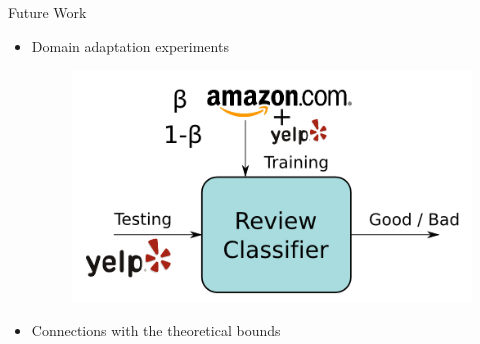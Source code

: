 \documentclass{beamer}
\begin{document}
\begin{frame}{Future Work}
\begin{itemize}
\item Domain adaptation experiments
\begin{figure}[ht]
\centering
\includegraphics[scale=.3]{adaptation}
\label{fig:adaptation}
\end{figure}
\item Connections with the theoretical bounds
\end{itemize}

\end{frame}
\end{document}
